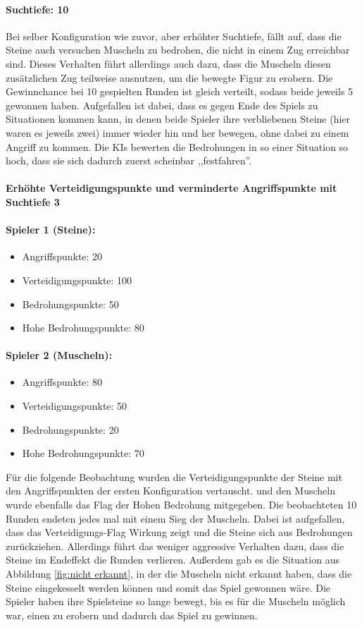 \paragraph{Suchtiefe: 10}
Bei selber Konfiguration wie zuvor, aber erhöhter Suchtiefe, fällt auf, dass die Steine  auch versuchen Muscheln zu bedrohen, die nicht in einem Zug erreichbar sind. Dieses Verhalten führt allerdings auch dazu, dass die Muscheln diesen zusätzlichen Zug teilweise ausnutzen, um die bewegte Figur zu erobern. Die Gewinnchance bei 10 gespielten Runden ist gleich verteilt, sodass beide jeweils 5 gewonnen haben. Aufgefallen ist dabei, dass es gegen Ende des Spiels zu Situationen kommen kann, in denen beide Spieler ihre verbliebenen Steine (hier waren es jeweils zwei) immer wieder hin und her bewegen, ohne dabei zu einem Angriff zu kommen. Die KIs bewerten die Bedrohungen in so einer Situation so hoch, dass sie sich dadurch zuerst scheinbar ,,festfahren''.


\paragraph{Erhöhte Verteidigungspunkte und verminderte Angriffspunkte mit Suchtiefe 3}

\paragraph{Spieler 1 (Steine):}
\begin{itemize}
	\item Angriffspunkte: 20
	\item Verteidigungspunkte: 100
	\item Bedrohungspunkte: 50
	\item Hohe Bedrohungspunkte: 80
\end{itemize}

\paragraph{Spieler 2 (Muscheln):}
\begin{itemize}
	\item Angriffspunkte: 80
	\item Verteidigungspunkte: 50
	\item Bedrohungspunkte: 20
	\item Hohe Bedrohungspunkte: 70
\end{itemize}

Für die folgende Beobachtung wurden die Verteidigungspunkte der Steine mit den Angriffspunkten der ersten Konfiguration vertauscht. und den Muscheln wurde ebenfalls das Flag der Hohen Bedrohung mitgegeben. Die beobachteten 10 Runden endeten jedes mal mit einem Sieg der Muscheln. Dabei ist aufgefallen, dass das Verteidigungs-Flag Wirkung zeigt und die Steine sich aus Bedrohungen zurückziehen. Allerdings führt das weniger aggressive Verhalten dazu, dass die Steine im Endeffekt die Runden verlieren. Außerdem gab es die Situation aus Abbildung \ref{fig:nicht erkannt}, in der die Muscheln nicht erkannt haben, dass die Steine eingekesselt werden können und somit das Spiel gewonnen wäre. Die Spieler haben ihre Spielsteine so lange bewegt, bis es für die Muscheln möglich war, einen zu erobern und dadurch das Spiel zu gewinnen.

